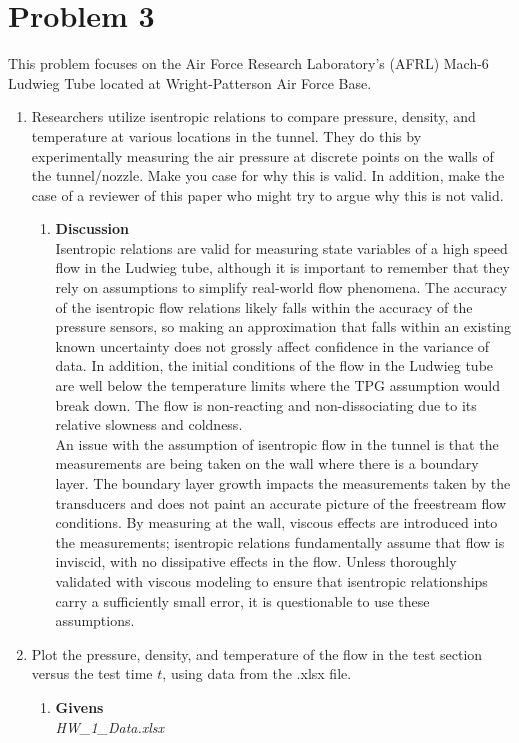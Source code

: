 \documentclass[12pt,letterpaper]{article}
\begin{document}
	\section*{Problem 3}
	This problem focuses on the Air Force Research Laboratory's (AFRL) Mach-6 Ludwieg Tube located at Wright-Patterson Air Force Base. 
	\begin{enumerate}[label=(\alph*)]
		\item Researchers utilize isentropic relations to compare pressure, density, and temperature at various locations in the tunnel. They do this by experimentally measuring the air pressure at discrete points on the walls of the tunnel/nozzle. Make you case for why this is valid. In addition, make the case of a reviewer of this paper who might try to argue why this is not valid.
		\begin{enumerate}[label=\arabic*.]
			\item{\textbf{Discussion}} \\
			Isentropic relations are valid for measuring state variables of a high speed flow in the Ludwieg tube, although it is important to remember that they rely on assumptions to simplify real-world flow phenomena. The accuracy of the isentropic flow relations likely falls within the accuracy of the pressure sensors, so making an approximation that falls within an existing known uncertainty does not grossly affect confidence in the variance of data. In addition, the initial conditions of the flow in the Ludwieg tube are well below the temperature limits where the TPG assumption would break down. The flow is non-reacting and non-dissociating due to its relative slowness and coldness. 
			\\
			An issue with the assumption of isentropic flow in the tunnel is that the measurements are being taken on the wall where there is a boundary layer. The boundary layer growth impacts the measurements taken by the transducers and does not paint an accurate picture of the freestream flow conditions. By measuring at the wall, viscous effects are introduced into the measurements; isentropic relations fundamentally assume that flow is inviscid, with no dissipative effects in the flow. Unless thoroughly validated with viscous modeling to ensure that isentropic relationships carry a sufficiently small error, it is questionable to use these assumptions.%
		\end{enumerate}
		\item Plot the pressure, density, and temperature of the flow in the test section versus the test time $t$, using data from the .xlsx file.
		\begin{enumerate}[label=\arabic*.]
			\item{\textbf{Givens}}\\
			\textit{HW\_1\_Data.xlsx}
			

\end{enumerate}
\end{enumerate}
\end{document}

